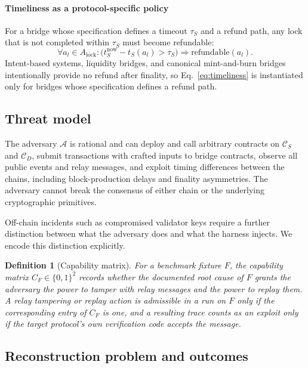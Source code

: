 \documentclass[a4paper]{cas-sc}
\newtheorem{definition}{Definition}
\begin{document}
\paragraph{Timeliness as a protocol-specific policy}
For a bridge whose specification defines a timeout $\tau_S$ and a refund path, any lock that is not completed within $\tau_S$ must become refundable:
\begin{equation}\label{eq:timeliness}
    \forall a_l \in A_{\text{lock}}: \bigl(t_S^{\text{now}} - t_S(a_l) > \tau_S\bigr) \Rightarrow \text{refundable}(a_l).
\end{equation}
Intent-based systems, liquidity bridges, and canonical mint-and-burn bridges intentionally provide no refund after finality, so Eq.~\eqref{eq:timeliness} is instantiated only for bridges whose specification defines a refund path.

\subsection{Threat model}

The adversary $\mathcal{A}$ is rational and can deploy and call arbitrary contracts on $\mathcal{C}_S$ and $\mathcal{C}_D$, submit transactions with crafted inputs to bridge contracts, observe all public events and relay messages, and exploit timing differences between the chains, including block-production delays and finality asymmetries. The adversary cannot break the consensus of either chain or the underlying cryptographic primitives.

Off-chain incidents such as compromised validator keys require a further distinction between what the adversary does and what the harness injects. We encode this distinction explicitly.

\begin{definition}[Capability matrix]\label{def:capability}
For a benchmark fixture $F$, the capability matrix $C_F \in \{0,1\}^{2}$ records whether the documented root cause of $F$ grants the adversary the power to tamper with relay messages and the power to replay them. A relay tampering or replay action is admissible in a run on $F$ only if the corresponding entry of $C_F$ is one, and a resulting trace counts as an exploit only if the target protocol's own verification code accepts the message.
\end{definition}

\subsection{Reconstruction problem and outcomes}
\end{document}
